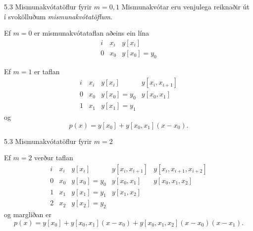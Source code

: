 \begin{frame}{5.3 Mismunakvótatöflur fyrir $m=0,1$} 
Mismunakvótar eru venjulega reiknaðir út í svokölluðum
{\it mismunakvótatöflum}.

\pause
\smallskip
Ef $m = 0$ er mismunakvótataflan aðeins ein lína
\begin{equation*}
  \begin{array}{c|c|c}
    i & x_i & y[x_i] \\
    \hline
    0 & x_0 & y[x_0] = y_0
  \end{array}
\end{equation*}

\pause
\smallskip
Ef $m = 1$ er taflan
\begin{equation*}
  \begin{array}{c|c|cc}
    i & x_i & y[x_i] & y[x_i,x_{i+1}] \\
    \hline
    0 & x_0 & y[x_0] = y_0 & y[x_0,x_1] \\
    1 & x_1 & y[x_1] = y_1 & 
  \end{array}
\end{equation*}
og
\begin{equation*}
  p(x) = y[x_0] + y[x_0,x_1](x-x_0).
\end{equation*}
\end{frame}

\begin{frame}{5.3 Mismunakvótatöflur fyrir $m=2$} 

Ef $m = 2$ verður taflan
\begin{equation*}
  \begin{array}{c|c|ccc}
    i & x_i & y[x_i] & y[x_i,x_{i+1}] & y[x_i,x_{i+1},x_{i+2}] \\
    \hline
    0 & x_0 & y[x_0] = y_0 & y[x_0,x_1] & y[x_0,x_1,x_2] \\
    1 & x_1 & y[x_1] = y_1 & y[x_1,x_2] & \\
    2 & x_2 & y[x_2] = y_2 &  & 
  \end{array}
\end{equation*}
og margliðan er
\begin{equation*}
  p(x) = y[x_0] + y[x_0,x_1](x-x_0) 
  + y[x_0,x_1,x_2](x-x_0)(x-x_1).
\end{equation*}
\end{frame}

